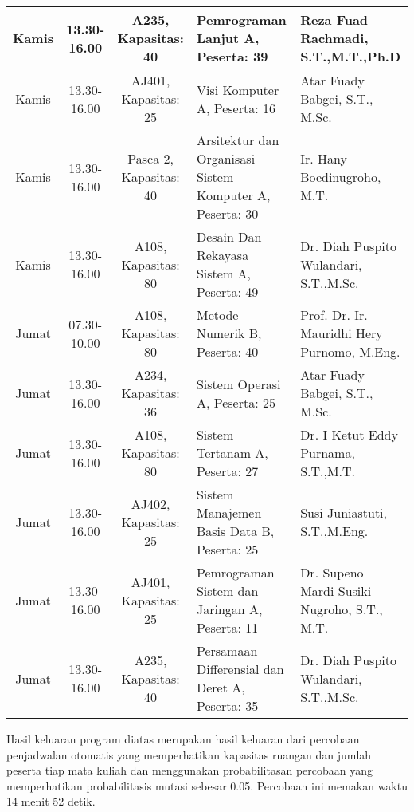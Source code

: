 \begin{longtable}[c]{|c|c|c|>{\centering\arraybackslash}m{3cm}|>{\centering\arraybackslash}m{3cm}|}
  Kamis  & 13.30-16.00 & A235, Kapasitas: 40    & Pemrograman Lanjut A, \linebreak Peserta: 39                        & Reza Fuad Rachmadi, S.T.,M.T.,Ph.D            \\ \hline
  Kamis  & 13.30-16.00 & AJ401, Kapasitas: 25   & Visi Komputer A, \linebreak Peserta: 16                             & Atar Fuady Babgei, S.T., M.Sc.                \\ \hline
  Kamis  & 13.30-16.00 & Pasca 2, Kapasitas: 40 & Arsitektur dan Organisasi Sistem Komputer A, \linebreak Peserta: 30 & Ir. Hany Boedinugroho, M.T.                   \\ \hline
  Kamis  & 13.30-16.00 & A108, Kapasitas: 80    & Desain Dan Rekayasa Sistem A, \linebreak Peserta: 49                & Dr. Diah Puspito Wulandari, S.T.,M.Sc.        \\ \hline
  \rowcolor[HTML]{DAE8FC} 
  Jumat  & 07.30-10.00 & A108, Kapasitas: 80    & Metode Numerik B, \linebreak Peserta: 40                            & Prof. Dr. Ir. Mauridhi Hery Purnomo, M.Eng.   \\ \hline
  \rowcolor[HTML]{DAE8FC} 
  Jumat  & 13.30-16.00 & A234, Kapasitas: 36    & Sistem Operasi A, \linebreak Peserta: 25                            & Atar Fuady Babgei, S.T., M.Sc.                \\ \hline
  \rowcolor[HTML]{DAE8FC} 
  Jumat  & 13.30-16.00 & A108, Kapasitas: 80    & Sistem Tertanam A, \linebreak Peserta: 27                           & Dr. I Ketut Eddy Purnama, S.T.,M.T.           \\ \hline
  \rowcolor[HTML]{DAE8FC} 
  Jumat  & 13.30-16.00 & AJ402, Kapasitas: 25   & Sistem Manajemen Basis Data B, \linebreak Peserta: 25               & Susi Juniastuti, S.T.,M.Eng.                  \\ \hline
  \rowcolor[HTML]{DAE8FC} 
  Jumat  & 13.30-16.00 & AJ401, Kapasitas: 25   & Pemrograman Sistem dan Jaringan A, \linebreak Peserta: 11           & Dr. Supeno Mardi Susiki Nugroho, S.T., M.T.   \\ \hline
  \rowcolor[HTML]{DAE8FC} 
  Jumat  & 13.30-16.00 & A235, Kapasitas: 40    & Persamaan Differensial dan Deret A, \linebreak Peserta: 35          & Dr. Diah Puspito Wulandari, S.T.,M.Sc.        \\ \hline
\end{longtable}
Hasil keluaran program diatas merupakan hasil keluaran dari percobaan penjadwalan otomatis yang memperhatikan kapasitas ruangan dan jumlah peserta tiap mata kuliah dan menggunakan probabilitasan percobaan yang memperhatikan probabilitasis mutasi sebesar 0.05. Percobaan ini memakan waktu 14 menit 52 detik.

